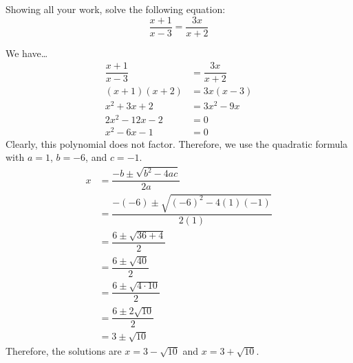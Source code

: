 \documentclass[11pt,letterpaper]{article}
\begin{document}
\newpage



 Showing all your work, solve the following equation:
	\[
	\dfrac{x + 1}{x - 3}= \dfrac{3x}{x + 2}
	\] \pspace

\sol We have\dots
	\[
	\begin{aligned}
	\dfrac{x + 1}{x - 3}&= \dfrac{3x}{x + 2} \\[0.3cm]
	(x + 1)(x + 2)&= 3x(x - 3) \\[0.3cm]
	x^2 + 3x + 2&= 3x^2 - 9x \\[0.3cm]
	2x^2 - 12x - 2&= 0 \\[0.3cm]
	x^2 - 6x - 1&= 0 
	\end{aligned}
	\] \pspace
Clearly, this polynomial does not factor. Therefore, we use the quadratic formula with $a= 1$, $b= -6$, and $c= -1$. 
	\[
	\begin{aligned}
	x&= \dfrac{-b \pm \sqrt{b^2 - 4ac}}{2a} \\[0.3cm]
	&= \dfrac{-(-6) \pm \sqrt{(-6)^2 - 4(1)(-1)}}{2(1)} \\[0.3cm]
	&= \dfrac{6 \pm \sqrt{36 + 4}}{2} \\[0.3cm]
	&= \dfrac{6 \pm \sqrt{40}}{2} \\[0.3cm]
	&= \dfrac{6 \pm \sqrt{4 \cdot 10}}{2} \\[0.3cm]
	&= \dfrac{6 \pm 2 \sqrt{10}}{2} \\[0.3cm]
	&= 3 \pm \sqrt{10}
	\end{aligned}
	\] \pspace
Therefore, the solutions are $x= 3 - \sqrt{10}$ and $x= 3 + \sqrt{10}$. 
\end{document}
